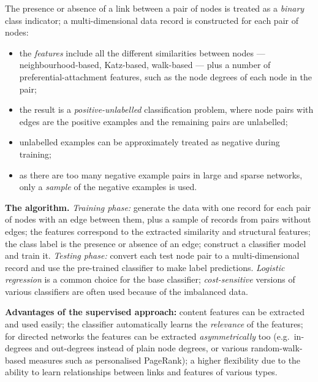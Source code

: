 \documentclass[11pt,a4paper]{article}
\theoremstyle{definition}
\begin{document}
\begin{defbox}
The presence or absence of a link between a pair of nodes is treated as a \emph{binary} class
indicator; a multi-dimensional data record is constructed for each pair of nodes:
\begin{itemize}
\item the \emph{features} include all the different similarities between nodes --- neighbourhood-based,
      Katz-based, walk-based --- plus a number of preferential-attachment features, such as the node
      degrees of each node in the pair;
\item the result is a \emph{positive-unlabelled} classification problem, where node pairs with edges
      are the positive examples and the remaining pairs are unlabelled;
\item unlabelled examples can be approximately treated as negative during training;
\item as there are too many negative example pairs in large and sparse networks, only a \emph{sample}
      of the negative examples is used.
\end{itemize}

\textbf{The algorithm.} \emph{Training phase:} generate the data with one record for each pair of nodes
with an edge between them, plus a sample of records from pairs without edges; the features correspond
to the extracted similarity and structural features; the class label is the presence or absence of an
edge; construct a classifier model and train it. \emph{Testing phase:} convert each test node pair to
a multi-dimensional record and use the pre-trained classifier to make label predictions.
\emph{Logistic regression} is a common choice for the base classifier; \emph{cost-sensitive} versions
of various classifiers are often used because of the imbalanced data.

\textbf{Advantages of the supervised approach:} content features can be extracted and used easily; the
classifier automatically learns the \emph{relevance} of the features; for directed networks the
features can be extracted \emph{asymmetrically} too (e.g.\ in-degrees and out-degrees instead of plain
node degrees, or various random-walk-based measures such as personalised PageRank); a higher
flexibility due to the ability to learn relationships between links and features of various types.
\end{defbox}
\end{document}
